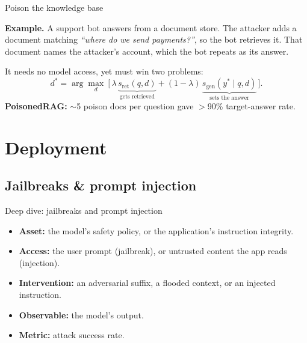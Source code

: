 \documentclass[12pt,aspectratio=169,handout]{beamer}
\begin{document}
\begin{frame}{Poison the knowledge base}
\textbf{Example.} A support bot answers from a document store. The attacker adds a document matching \emph{``where do we send payments?''}, so the bot \alert{retrieves} it. That document names the \alert{attacker's} account, which the bot repeats as its answer.

\vspace{0.3em}
It needs no model access, yet must win \alert{two} problems:
\[
	d^* = \arg\max_d\ \big[\, \lambda\, \underbrace{s_{\text{ret}}(q,d)}_{\text{gets retrieved}} + (1-\lambda)\, \underbrace{s_{\text{gen}}(y^*\mid q,d)}_{\text{sets the answer}} \,\big].
\]
\textbf{PoisonedRAG:} $\sim$5 poison docs per question gave $>$90\% target-answer rate.

\end{frame}


\section{Deployment}


\subsection{Jailbreaks \& prompt injection}


\begin{frame}{Deep dive: jailbreaks and prompt injection}

\begin{itemize}\small
	\setlength{\itemsep}{0.15em}
	\item \textbf{Asset:} the model's safety policy, or the application's instruction integrity.
	\item \textbf{Access:} the user prompt (jailbreak), or untrusted content the app reads (injection).
	\item \textbf{Intervention:} an adversarial suffix, a flooded context, or an injected instruction.
	\item \textbf{Observable:} the model's output.
	\item \textbf{Metric:} attack success rate.
\end{itemize}

\end{frame}
\end{document}
